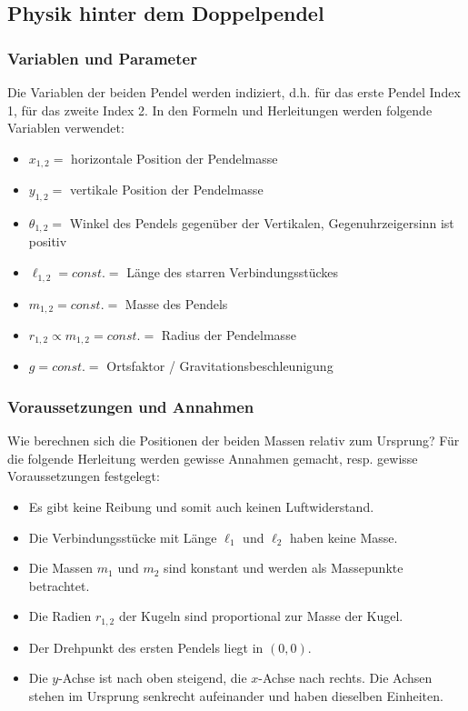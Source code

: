 \documentclass[titlepage, 11pt, a4paper, ngerman]{article}
\begin{document}
\subsection{Physik hinter dem Doppelpendel}
\subsubsection{Variablen und Parameter}
Die Variablen der beiden Pendel werden indiziert, d.h. für das erste Pendel Index 1, für das zweite Index 2. In den Formeln und Herleitungen werden folgende Variablen verwendet:
\begin{itemize}
    \item $x_{1, 2} = $ horizontale Position der Pendelmasse
    \item $y_{1, 2} = $ vertikale Position der Pendelmasse
    \item $\theta_{1, 2} = $ Winkel des Pendels gegenüber der Vertikalen, Gegenuhrzeigersinn ist positiv
    \item $\ell_{1, 2} = const. = $ Länge des starren Verbindungsstückes
    \item $m_{1, 2} = const. = $ Masse des Pendels
    \item $r_{1, 2} \propto m_{1, 2} = const. = $ Radius der Pendelmasse
    \item $g = const. = $ Ortsfaktor / Gravitationsbeschleunigung
\end{itemize}

\subsubsection{Voraussetzungen und Annahmen}
Wie berechnen sich die Positionen der beiden Massen relativ zum Ursprung? Für die folgende Herleitung werden gewisse Annahmen gemacht, resp. gewisse Voraussetzungen festgelegt:
\begin{itemize}
    \item Es gibt keine Reibung und somit auch keinen Luftwiderstand.
    \item Die Verbindungsstücke mit Länge $\ell_{1}$ und $\ell_{2}$ haben keine Masse.
    \item Die Massen $m_{1}$ und $m_{2}$ sind konstant und werden als Massepunkte betrachtet.
    \item Die Radien $r_{1, 2}$ der Kugeln sind proportional zur Masse der Kugel.
    \item Der Drehpunkt des ersten Pendels liegt in $(0, 0)$.
    \item Die $y$-Achse ist nach oben steigend, die $x$-Achse nach rechts. Die Achsen stehen im Ursprung senkrecht aufeinander und haben dieselben Einheiten.
\end{itemize}
\end{document}
